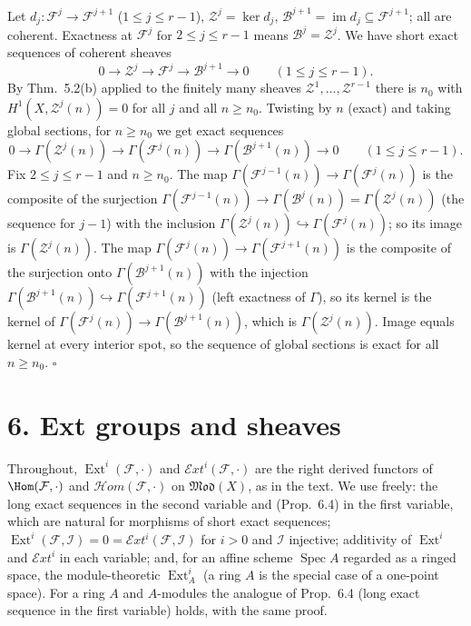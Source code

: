 \documentclass[11pt]{article}
\begin{document}
\pf
Let $d_j\colon\mathcal F^j\to\mathcal F^{j+1}$ ($1\le j\le r-1$), $\mathcal Z^j=\ker d_j$, $\mathcal B^{j+1}=\operatorname{im}d_j\subseteq\mathcal F^{j+1}$; all are coherent. Exactness at $\mathcal F^j$ for $2\le j\le r-1$ means $\mathcal B^j=\mathcal Z^j$. We have short exact sequences of coherent sheaves
\[
0\to\mathcal Z^j\to\mathcal F^j\to\mathcal B^{j+1}\to0\qquad(1\le j\le r-1).
\]
By Thm.~5.2(b) applied to the finitely many sheaves $\mathcal Z^1,\dots,\mathcal Z^{r-1}$ there is $n_0$ with $H^1(X,\mathcal Z^j(n))=0$ for all $j$ and all $n\ge n_0$. Twisting by $n$ (exact) and taking global sections, for $n\ge n_0$ we get exact sequences
\[
0\to\Gamma(\mathcal Z^j(n))\to\Gamma(\mathcal F^j(n))\to\Gamma(\mathcal B^{j+1}(n))\to0\qquad(1\le j\le r-1).
\]
Fix $2\le j\le r-1$ and $n\ge n_0$. The map $\Gamma(\mathcal F^{j-1}(n))\to\Gamma(\mathcal F^j(n))$ is the composite of the surjection $\Gamma(\mathcal F^{j-1}(n))\to\Gamma(\mathcal B^j(n))=\Gamma(\mathcal Z^j(n))$ (the sequence for $j-1$) with the inclusion $\Gamma(\mathcal Z^j(n))\hookrightarrow\Gamma(\mathcal F^j(n))$; so its image is $\Gamma(\mathcal Z^j(n))$. The map $\Gamma(\mathcal F^j(n))\to\Gamma(\mathcal F^{j+1}(n))$ is the composite of the surjection onto $\Gamma(\mathcal B^{j+1}(n))$ with the injection $\Gamma(\mathcal B^{j+1}(n))\hookrightarrow\Gamma(\mathcal F^{j+1}(n))$ (left exactness of $\Gamma$), so its kernel is the kernel of $\Gamma(\mathcal F^j(n))\to\Gamma(\mathcal B^{j+1}(n))$, which is $\Gamma(\mathcal Z^j(n))$. Image equals kernel at every interior spot, so the sequence of global sections is exact for all $n\ge n_0$. \hfill$\square$

\section*{6. Ext groups and sheaves}

Throughout, $\operatorname{Ext}^i(\mathcal F,\cdot)$ and $\mathcal{E}xt^i(\mathcal F,\cdot)$ are the right derived functors of $\Hom(\mathcal F,\cdot)$ and $\mathcal{H}om(\mathcal F,\cdot)$ on $\mathfrak{Mod}(X)$, as in the text. We use freely: the long exact sequences in the second variable and (Prop.~6.4) in the first variable, which are natural for morphisms of short exact sequences; $\operatorname{Ext}^i(\mathcal F,\mathcal I)=0=\mathcal{E}xt^i(\mathcal F,\mathcal I)$ for $i>0$ and $\mathcal I$ injective; additivity of $\operatorname{Ext}^i$ and $\mathcal{E}xt^i$ in each variable; and, for an affine scheme $\operatorname{Spec}A$ regarded as a ringed space, the module-theoretic $\operatorname{Ext}^i_A$ (a ring $A$ is the special case of a one-point space). For a ring $A$ and $A$-modules the analogue of Prop.~6.4 (long exact sequence in the first variable) holds, with the same proof.
\end{document}
